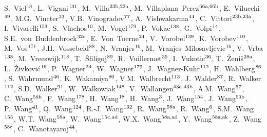 \begin{flushleft}
S.~Viel$^\textrm{\scriptsize 18}$,    
L.~Vigani$^\textrm{\scriptsize 131}$,    
M.~Villa$^\textrm{\scriptsize 23b,23a}$,    
M.~Villaplana~Perez$^\textrm{\scriptsize 66a,66b}$,    
E.~Vilucchi$^\textrm{\scriptsize 49}$,    
M.G.~Vincter$^\textrm{\scriptsize 33}$,    
V.B.~Vinogradov$^\textrm{\scriptsize 77}$,    
A.~Vishwakarma$^\textrm{\scriptsize 44}$,    
C.~Vittori$^\textrm{\scriptsize 23b,23a}$,    
I.~Vivarelli$^\textrm{\scriptsize 153}$,    
S.~Vlachos$^\textrm{\scriptsize 10}$,    
M.~Vogel$^\textrm{\scriptsize 179}$,    
P.~Vokac$^\textrm{\scriptsize 138}$,    
G.~Volpi$^\textrm{\scriptsize 14}$,    
S.E.~von~Buddenbrock$^\textrm{\scriptsize 32c}$,    
E.~Von~Toerne$^\textrm{\scriptsize 24}$,    
V.~Vorobel$^\textrm{\scriptsize 139}$,    
K.~Vorobev$^\textrm{\scriptsize 110}$,    
M.~Vos$^\textrm{\scriptsize 171}$,    
J.H.~Vossebeld$^\textrm{\scriptsize 88}$,    
N.~Vranjes$^\textrm{\scriptsize 16}$,    
M.~Vranjes~Milosavljevic$^\textrm{\scriptsize 16}$,    
V.~Vrba$^\textrm{\scriptsize 138}$,    
M.~Vreeswijk$^\textrm{\scriptsize 118}$,    
T.~\v{S}filigoj$^\textrm{\scriptsize 89}$,    
R.~Vuillermet$^\textrm{\scriptsize 35}$,    
I.~Vukotic$^\textrm{\scriptsize 36}$,    
T.~\v{Z}eni\v{s}$^\textrm{\scriptsize 28a}$,    
L.~\v{Z}ivkovi\'{c}$^\textrm{\scriptsize 16}$,    
P.~Wagner$^\textrm{\scriptsize 24}$,    
W.~Wagner$^\textrm{\scriptsize 179}$,    
J.~Wagner-Kuhr$^\textrm{\scriptsize 112}$,    
H.~Wahlberg$^\textrm{\scriptsize 86}$,    
S.~Wahrmund$^\textrm{\scriptsize 46}$,    
K.~Wakamiya$^\textrm{\scriptsize 80}$,    
V.M.~Walbrecht$^\textrm{\scriptsize 113}$,    
J.~Walder$^\textrm{\scriptsize 87}$,    
R.~Walker$^\textrm{\scriptsize 112}$,    
S.D.~Walker$^\textrm{\scriptsize 91}$,    
W.~Walkowiak$^\textrm{\scriptsize 148}$,    
V.~Wallangen$^\textrm{\scriptsize 43a,43b}$,    
A.M.~Wang$^\textrm{\scriptsize 57}$,    
C.~Wang$^\textrm{\scriptsize 58b}$,    
F.~Wang$^\textrm{\scriptsize 178}$,    
H.~Wang$^\textrm{\scriptsize 18}$,    
H.~Wang$^\textrm{\scriptsize 3}$,    
J.~Wang$^\textrm{\scriptsize 154}$,    
J.~Wang$^\textrm{\scriptsize 59b}$,    
P.~Wang$^\textrm{\scriptsize 41}$,    
Q.~Wang$^\textrm{\scriptsize 124}$,    
R.-J.~Wang$^\textrm{\scriptsize 132}$,    
R.~Wang$^\textrm{\scriptsize 58a}$,    
R.~Wang$^\textrm{\scriptsize 6}$,    
S.M.~Wang$^\textrm{\scriptsize 155}$,    
W.T.~Wang$^\textrm{\scriptsize 58a}$,    
W.~Wang$^\textrm{\scriptsize 15c,ad}$,    
W.X.~Wang$^\textrm{\scriptsize 58a,ad}$,    
Y.~Wang$^\textrm{\scriptsize 58a,ak}$,    
Z.~Wang$^\textrm{\scriptsize 58c}$,    
C.~Wanotayaroj$^\textrm{\scriptsize 44}$,    

\end{flushleft}
